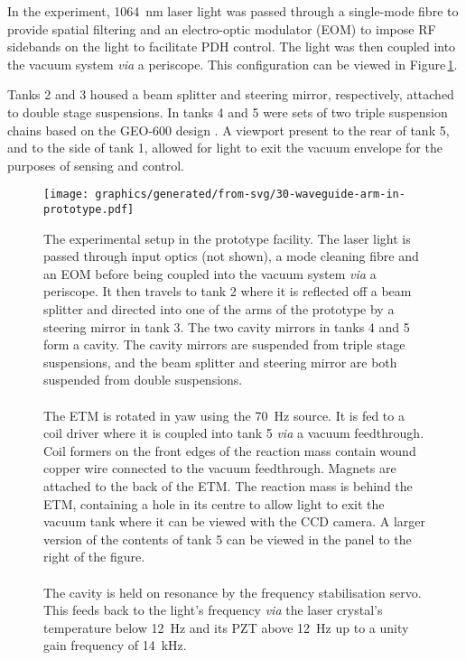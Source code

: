 In the experiment, \SI{1064}{\nano\meter} laser light was passed through a single-mode fibre to provide spatial filtering and an electro-optic modulator (EOM) to impose RF sidebands on the light to facilitate PDH control. The light was then coupled into the vacuum system \emph{via} a periscope. This configuration can be viewed in Figure\,\ref{fig:prototype-setup}.

Tanks 2 and 3 housed a beam splitter and steering mirror, respectively, attached to double stage suspensions. In tanks 4 and 5 were sets of two triple suspension chains based on the GEO-600 design \cite{Plissi2000}. A viewport present to the rear of tank 5, and to the side of tank 1, allowed for light to exit the vacuum envelope for the purposes of sensing and control.

\begin{figure}
  \centering
  \texttt{[image: graphics/generated/from-svg/30-waveguide-arm-in-prototype.pdf]}
  \caption{\label{fig:prototype-setup}The experimental setup in the prototype facility. The laser light is passed through input optics (not shown), a mode cleaning fibre and an EOM before being coupled into the vacuum system \emph{via} a periscope. It then travels to tank 2 where it is reflected off a beam splitter and directed into one of the arms of the prototype by a steering mirror in tank 3. The two cavity mirrors in tanks 4 and 5 form a \FP{} cavity. The cavity mirrors are suspended from triple stage suspensions, and the beam splitter and steering mirror are both suspended from double suspensions. \\
  \\The \gls{ETM} is rotated in yaw using the \SI{70}{\hertz} source. It is fed to a coil driver where it is coupled into tank 5 \emph{via} a vacuum feedthrough. Coil formers on the front edges of the reaction mass contain wound copper wire connected to the vacuum feedthrough. Magnets are attached to the back of the \gls{ETM}. The reaction mass is behind the \gls{ETM}, containing a hole in its centre to allow light to exit the vacuum tank where it can be viewed with the CCD camera. A larger version of the contents of tank 5 can be viewed in the panel to the right of the figure. \\
  \\The cavity is held on resonance by the frequency stabilisation servo. This feeds back to the light's frequency \emph{via} the laser crystal's temperature below \SI{12}{\hertz} and its PZT above \SI{12}{\hertz} up to a unity gain frequency of \SI{14}{\kilo \hertz}.}
\end{figure}

